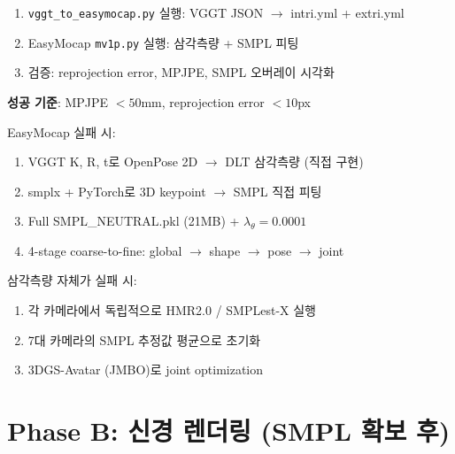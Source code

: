 \documentclass[11pt, a4paper]{report}
\begin{document}
\begin{pipelinebox}[title={A1. VGGT $\rightarrow$ EasyMocap (1일)}]
\begin{enumerate}[leftmargin=*]
  \item \texttt{vggt\_to\_easymocap.py} 실행: VGGT JSON $\rightarrow$ intri.yml + extri.yml
  \item EasyMocap \texttt{mv1p.py} 실행: 삼각측량 + SMPL 피팅
  \item 검증: reprojection error, MPJPE, SMPL 오버레이 시각화
\end{enumerate}
\textbf{성공 기준}: MPJPE $< 50$mm, reprojection error $< 10$px
\end{pipelinebox}

\begin{pipelinebox}[title={A2. Fallback: smplx 직접 피팅 (2--3일)}]
EasyMocap 실패 시:
\begin{enumerate}[leftmargin=*]
  \item VGGT K, R, t로 OpenPose 2D $\rightarrow$ DLT 삼각측량 (직접 구현)
  \item smplx + PyTorch로 3D keypoint $\rightarrow$ SMPL 직접 피팅
  \item Full SMPL\_NEUTRAL.pkl (21MB) + $\lambda_\theta = 0.0001$
  \item 4-stage coarse-to-fine: global $\rightarrow$ shape $\rightarrow$ pose $\rightarrow$ joint
\end{enumerate}
\end{pipelinebox}

\begin{pipelinebox}[title={A3. Extreme Fallback: HMR 초기값 (1일)}]
삼각측량 자체가 실패 시:
\begin{enumerate}[leftmargin=*]
  \item 각 카메라에서 독립적으로 HMR2.0 / SMPLest-X 실행
  \item 7대 카메라의 SMPL 추정값 평균으로 초기화
  \item 3DGS-Avatar (JMBO)로 joint optimization
\end{enumerate}
\end{pipelinebox}


\section{Phase B: 신경 렌더링 (SMPL 확보 후)}
\end{document}
